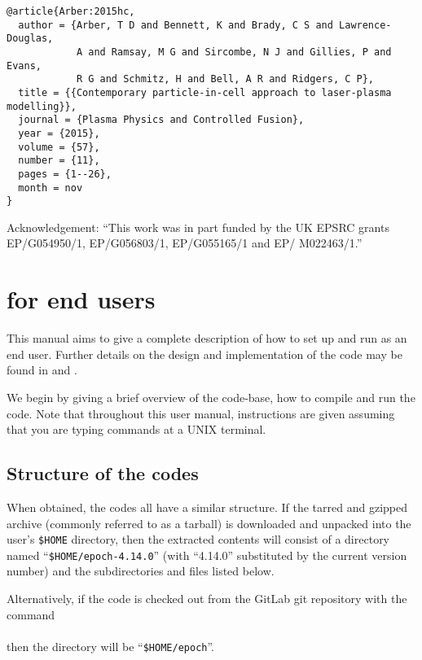 \begin{verbatim}
@article{Arber:2015hc,
  author = {Arber, T D and Bennett, K and Brady, C S and Lawrence-Douglas,
            A and Ramsay, M G and Sircombe, N J and Gillies, P and Evans,
            R G and Schmitz, H and Bell, A R and Ridgers, C P},
  title = {{Contemporary particle-in-cell approach to laser-plasma modelling}},
  journal = {Plasma Physics and Controlled Fusion},
  year = {2015},
  volume = {57},
  number = {11},
  pages = {1--26},
  month = nov
}
\end{verbatim}

Acknowledgement: ``This work was in part funded by the UK EPSRC grants
EP/G054950/1, EP/G056803/1, EP/G055165/1 and EP/ M022463/1.''

\newpage
\section{\texorpdfstring
  {{\EPOCH} for end users}
  {{EPOCH} for end users}}
\label{sec:endusers}
This manual aims to give a complete description of how to set up and run
{\EPOCH} as an end user. Further details on the design and implementation of
the code may be found in \citet{Arber} and \citet{Ridgers}.

We begin by giving a brief overview of the {\EPOCH} code-base, how to
compile and run the code. Note that throughout this user manual, instructions
are given assuming that you are typing commands at a UNIX terminal.

\subsection{\texorpdfstring
  {Structure of the {\EPOCH} codes}
  {Structure of the {EPOCH} codes}}
\label{sec:directory_structure}
When obtained, the {\EPOCH} codes all have a similar structure. If the tarred
and gzipped archive (commonly referred to as a tarball) is downloaded and
unpacked into the user's \verb|$HOME| directory, then the extracted contents
will consist of a directory named ``\verb|$HOME/epoch-4.14.0|''
(with ``4.14.0'' substituted by the current version number) and the
subdirectories and files listed below.

Alternatively, if the code is checked out from the GitLab git
repository with the command\\
\indent{}\\
\noindent%
then the directory will be ``\verb|$HOME/epoch|''.


